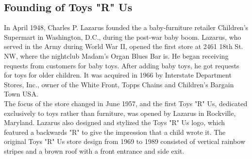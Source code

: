 \documentclass[11pt]{report}
\begin{document}
\subsection{Founding of Toys "R" Us}
In April 1948, Charles P. Lazarus founded the a baby-furniture retailer Children's Supermart in Washington, D.C., during the post-war baby boom. Lazarus, who served in the Army during World War II, opened the first store at 2461 18th St. NW, where the nightclub Madam's Organ Blues Bar is. He began receiving requests from customers for baby toys. After adding baby toys, he got requests for toys for older children. It was acquired in 1966 by Interstate Department Stores, Inc., owner of the White Front, Topps Chains and Children's Bargain Town USA.\\ \indent The focus of the store changed in June 1957, and the first Toys "R" Us, dedicated exclusively to toys rather than furniture, was opened by Lazarus in Rockville, Maryland. Lazarus also designed and stylized the Toys "R" Us logo, which featured a backwards "R" to give the impression that a child wrote it. The original Toys "R" Us store design from 1969 to 1989 consisted of vertical rainbow stripes and a brown roof with a front entrance and side exit.

\section{}
\end{document}
